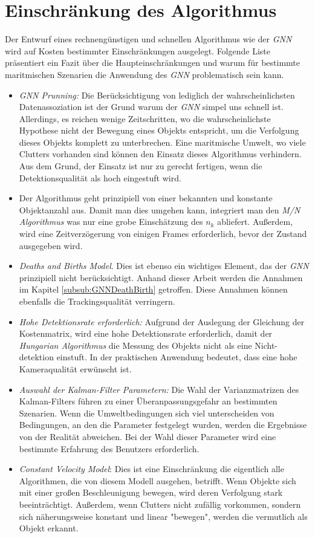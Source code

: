 \documentclass[10pt,a4paper]{article}
\begin{document}
\section{Einschränkung des Algorithmus}
Der Entwurf eines rechnengünstigen und schnellen Algorithmus wie der \textit{GNN} wird auf Kosten bestimmter Einschränkungen ausgelegt. Folgende Liste präsentiert ein Fazit über die Haupteinschränkungen und warum für bestimmte maritmischen Szenarien die Anwendung des \textit{GNN} problematisch sein kann.\\
\begin{itemize}
  \item \textit{GNN Prunning:} Die Berücksichtigung von lediglich der wahrscheinlichsten Datenassoziation ist der Grund warum der \textit{GNN} simpel uns schnell ist. Allerdings, es reichen wenige Zeitschritten, wo die wahrscheinlichste Hypothese nicht der Bewegung eines Objekts entspricht, um die Verfolgung dieses Objekts komplett zu unterbrechen. Eine maritmische Umwelt, wo viele Clutters vorhanden sind können den Einsatz dieses Algorithmus verhindern. Aus dem Grund, der Einsatz ist nur zu gerecht fertigen, wenn die Detektionsqualität als hoch eingestuft wird.
  \item Der Algorithmus geht prinzipiell von einer bekannten und konstante Objektanzahl aus. Damit man dies umgehen kann, integriert man den \textit{M/N Algorithmus} was nur eine grobe Einschätzung des $n_k$ abliefert. Außerdem, wird eine Zeitverzögerung von einigen Frames erforderlich, bevor der Zustand ausgegeben wird.
 \item \textit{Deaths and Births Model}. Dies ist ebenso ein wichtiges Element, das der \textit{GNN} prinzipiell nicht berücksichtigt. Anhand dieser Arbeit werden die Annahmen im Kapitel \ref{subsub:GNNDeathBirth} getroffen. Diese Annahmen können ebenfalls die Trackingsqualität verringern.
  \item \textit{Hohe Detektionsrate erforderlich:} Aufgrund der Auslegung der Gleichung der Kostenmatrix, wird eine hohe Detektionsrate erforderlich, damit der \textit{Hungarian Algorithmus} die Messung des Objekts nicht als eine Nicht-detektion einstuft. In der praktischen Anwendung bedeutet, dass eine hohe Kameraqualität erwünscht ist.
  \item \textit{Auswahl der Kalman-Filter Parametern:} Die Wahl der Varianzmatrizen des Kalman-Filters führen zu einer Überanpassungsgefahr an bestimmten Szenarien. Wenn die Umweltbedingungen sich viel unterscheiden von Bedingungen, an den die Parameter festgelegt wurden, werden die Ergebnisse von der Realität abweichen. Bei der Wahl dieser Parameter wird eine bestimmte Erfahrung des Benutzers erforderlich.
  \item \textit{Constant Velocity Model}: Dies ist eine Einschränkung die eigentlich alle Algorithmen, die von diesem Modell ausgehen, betrifft. Wenn Objekte sich mit einer großen Beschleunigung bewegen, wird deren Verfolgung stark beeinträchtigt. Außerdem, wenn Clutters nicht zufällig vorkommen, sondern sich näherungsweise konstant und linear "bewegen", werden die vermutlich als Objekt erkannt. 
\end{itemize}




\end{document}
